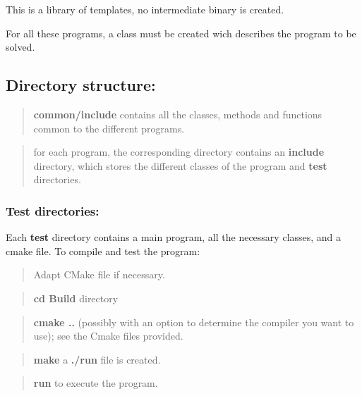 This is a library of templates, no intermediate binary is created.

For all these programs, a class must be created wich describes the program to be solved.\hypertarget{index_Directory}{}\subsection{Directory structure\+:}\label{index_Directory}
\begin{quote}
{\bfseries  common/include} contains all the classes, methods and functions common to the different programs. \end{quote}


\begin{quote}
for each program, the corresponding directory contains an {\bfseries include} directory, which stores the different classes of the program and {\bfseries test} directories. \end{quote}
\hypertarget{index_test}{}\subsubsection{Test directories\+:}\label{index_test}
Each {\bfseries  test} directory contains a main program, all the necessary classes, and a cmake file. To compile and test the program\+:

\begin{quote}
Adapt C\+Make file if necessary. \end{quote}


\begin{quote}
{\bfseries cd Build} directory \end{quote}


\begin{quote}
{\bfseries cmake ..} (possibly with an option to determine the compiler you want to use); see the Cmake files provided. \end{quote}


\begin{quote}
{\bfseries  make} a {\bfseries  ./run } file is created. \end{quote}


\begin{quote}
{\bfseries run} to execute the program.\end{quote}

